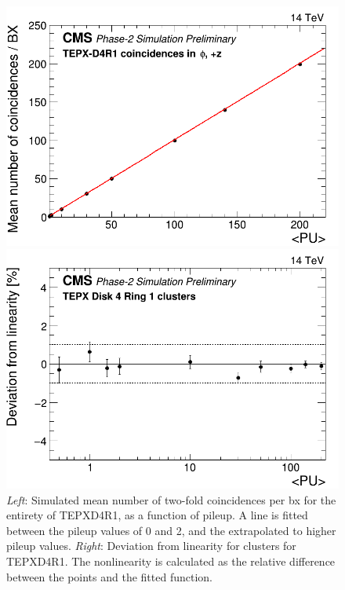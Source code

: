 \begin{center}
    \begin{figure}[H]
\begin{minipage}[b]{0.5\linewidth}
        \centering
        \includegraphics[scale=0.25]{Chapter4/plots/TEPX_Disk_4_Ring_1_mean_number_of_coincidences___bx_Linearity.png}
\end{minipage}
\begin{minipage}[b]{0.5\linewidth}
        \centering
        \includegraphics[scale=0.25]{Chapter4/plots/TEPX_Disk_4_Ring_1_mean_number_of_clusters___bx_Linearity_residuals.png}
\end{minipage}
    \caption[Linearity of TEPXD4R1 for two-fold coincidences.]{\textit{Left}: Simulated mean number of two-fold coincidences per bx for the entirety of TEPXD4R1, as a function of pileup. A line is fitted between the pileup values of 0 and 2, and the extrapolated to higher pileup values. \textit{Right}: Deviation from linearity for clusters for TEPXD4R1. The nonlinearity is calculated as the relative difference between the points and the fitted function.}
    \label{lin4}
\end{figure}
\end{center}
\pagebreak



